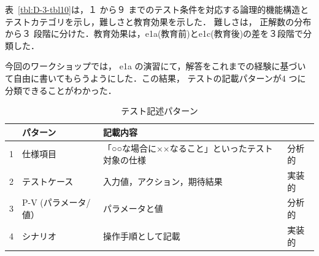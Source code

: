 \documentclass[a4paper,12pt]{jreport}
\begin{document}
表~\ref{tbl:D-3-tbl10}は，１ から９ までのテスト条件を対応する論理的機能構造とテストカテゴリを示し，難しさと教育効果を示した． 難しさは， 正解数の分布から３ 段階に分けた．教育効果は，e1a(教育前)とe1c(教育後)の差を３段階で分類した．

今回のワークショップでは， e1a の演習にて，解答をこれまでの経験に基づいて自由に書いてもらうようにした．この結果， テストの記載パターンが4 つに分類できることがわかった．
\begin{table}[htbp]
  \centering
  \caption{テスト記述パターン}
    \begin{tabular}{|c|p{8.57em}|p{10.215em}|p{3.855em}|}
    \hline
          & \textbf{パターン} & \textbf{記載内容} & \multicolumn{1}{c|}{} \bigstrut\\
    \hline
    1     & 仕様項目  & 「○○な場合に××なること」といったテスト対象の仕様 & 分析的 \bigstrut\\
    \hline
    2     & テストケース & 入力値，アクション，期待結果 & 実装的 \bigstrut\\
    \hline
    3     & P-V
(パラメータ/値） & パラメータと値 & 分析的 \bigstrut[t]\\
    4     & シナリオ  & 操作手順として記載 & 実装的 \bigstrut[b]\\
    \hline
    \end{tabular}%
  \label{tbl:D-3-tbl11}%
\end{table}%
\end{document}
